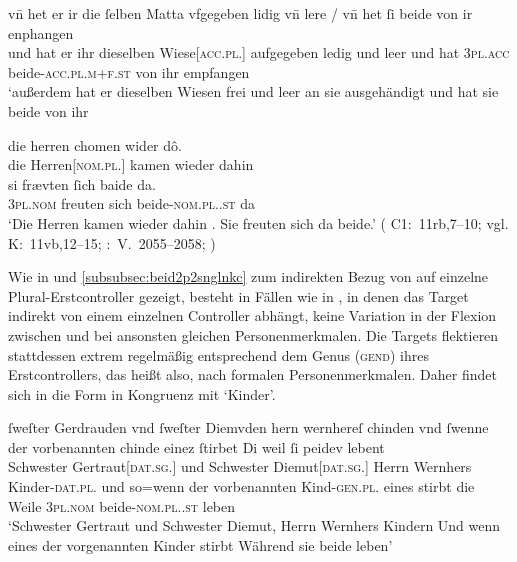 \begin{exe}
\ex \label{ex:pronindir}
	\begin{xlist}
	\ex \label{ex:pronindir_1}
		\gll vn̄ het er ir {die ſelben} Matta vfgegeben lidig vn̄ lere /
			vn̄ het ſi beide von ir enphangen \\
		und hat er ihr dieselben Wiese[\textsc{acc.pl.\FemI}] aufgegeben ledig
			und leer {} und hat \textsc{3pl\subI.acc}
			beide-\textsc{acc.pl.m+f\subI.st} von ihr empfangen \\
		\trans `außerdem hat er dieselben Wiesen frei und leer an sie
			ausgehändigt und hat sie beide von ihr 
			\parencites(Nr.~2733, Freiburg i.\,Br., 1297)[105,23--24]{cao4}

	\ex \label{ex:pronindir_2}
		\gll die herren chomen wider dô. \\
			die Herren[\textsc{nom.pl.\MascM}] kamen wieder dahin \\
			\textelp{}
	\sn \gll si frævten ſich baide da. \\
			\textsc{3pl\subM.nom} freuten sich beide-\textsc{nom.pl.\MascM.st}
			da \\
		\trans `Die Herren kamen wieder dahin \textelp{}. Sie freuten sich da
			beide.'
			(%
				C1:~11rb,7--10; vgl.
				K:~11vb,12--15;
				\KC:~V.~2055--2058;
				\cite[119]{schroeder1895}%
			)
	\end{xlist}
\end{exe}

Wie in  und \ref{subsubsec:beid2p2snglnkc}
zum indirekten Bezug von  auf einzelne Plural-Erstcontroller
gezeigt, besteht in Fällen wie in , in denen das Target
indirekt von einem einzelnen Controller abhängt, keine Variation in der Flexion
zwischen  und  bei ansonsten gleichen
Personenmerkmalen. Die Targets flektieren stattdessen extrem regelmäßig
entsprechend dem Genus (\textsc{gend}) ihres Erstcontrollers, das heißt also,
nach formalen Personenmerkmalen. Daher findet sich in
 die Form
 in Kongruenz mit  `Kinder'.

\begin{exe}
\ex \label{ex:f+f_kindesibeidiu}
	\gll ſweſter Gerdrauden vnd ſweſter Diemvden hern wernhereſ chinden
			\textelp{} vnd ſwenne der vorbenannten chinde einez ſtirbet
			\textelp{} Di weil ſi peidev lebent \\
		Schwester Gertraut[\textsc{dat.sg.\FemF}] und Schwester
			Diemut[\textsc{dat.sg.\FemF}] Herrn Wernhers
			Kinder-\textsc{dat.pl.\NeutF} {} und so=wenn der vorbenannten
			Kind-\textsc{gen.pl.\NeutF} eines stirbt {} die Weile
			\textsc{3pl\subF.nom} beide-\textsc{nom.pl.\NeutF.st} leben \\
	\trans `Schwester Gertraut und Schwester Diemut, Herrn Wernhers Kindern
		\textelp{} Und wenn eines der vorgenannten Kinder stirbt \textelp{}
		Während sie beide leben'
		\parencites(Nr.~2960, Engelthal, Kr.~Nürnberger Land, 1298)[240,31--38]{cao4}
\end{exe}

